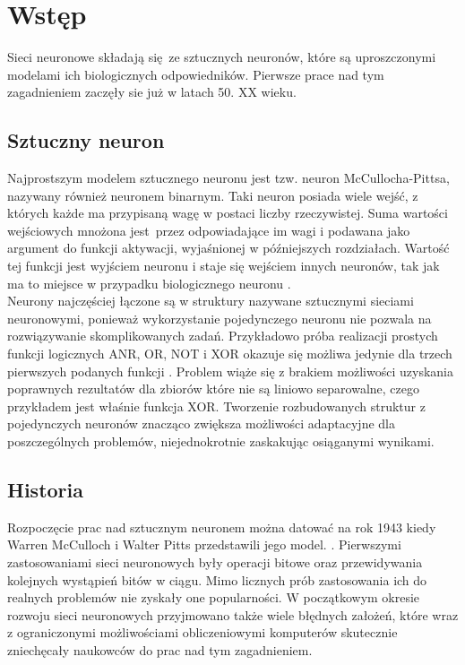 
\chapter{Wstęp}

Sieci neuronowe składają się ze sztucznych neuronów, które są uproszczonymi modelami ich
biologicznych odpowiedników. Pierwsze prace nad tym zagadnieniem zaczęły sie już w latach 50.
XX wieku.

\section{Sztuczny neuron}

Najprostszym modelem sztucznego neuronu jest tzw. neuron McCullocha-Pittsa, nazywany
również neuronem binarnym. Taki neuron posiada wiele wejść, z których każde ma przypisaną
wagę w postaci liczby rzeczywistej. Suma wartości wejściowych mnożona jest przez odpowiadające
im wagi i podawana jako argument do funkcji aktywacji, wyjaśnionej w późniejszych rozdziałach.
Wartość tej funkcji jest wyjściem neuronu i staje się wejściem innych neuronów,
tak jak ma to miejsce w przypadku biologicznego neuronu \cite{CS231n}.\\
Neurony najczęściej łączone są w struktury nazywane sztucznymi sieciami neuronowymi, ponieważ wykorzystanie
pojedynczego neuronu nie pozwala na rozwiązywanie skomplikowanych zadań.
Przykładowo próba realizacji prostych funkcji logicznych ANR, OR, NOT i XOR okazuje
się możliwa jedynie dla trzech pierwszych podanych funkcji \cite{XORproblem}.
Problem wiąże się z brakiem możliwości uzyskania poprawnych rezultatów dla zbiorów które
nie są liniowo separowalne, czego przykładem jest właśnie funkcja XOR. Tworzenie rozbudowanych
struktur z pojedynczych neuronów znacząco zwiększa możliwości adaptacyjne
dla poszczególnych problemów, niejednokrotnie zaskakując osiąganymi wynikami.

\section{Historia}

Rozpoczęcie prac nad sztucznym neuronem można datować na rok 1943 kiedy
Warren McCulloch i Walter Pitts przedstawili jego model. \cite{NNbiology}.
Pierwszymi zastosowaniami sieci neuronowych były operacji bitowe oraz przewidywania kolejnych
wystąpień bitów w ciągu. Mimo licznych prób zastosowania ich do realnych problemów
nie zyskały one popularności. W początkowym okresie rozwoju sieci neuronowych
przyjmowano także wiele błędnych założeń, które wraz z ograniczonymi możliwościami
obliczeniowymi komputerów skutecznie zniechęcały naukowców do prac nad tym zagadnieniem.\\
